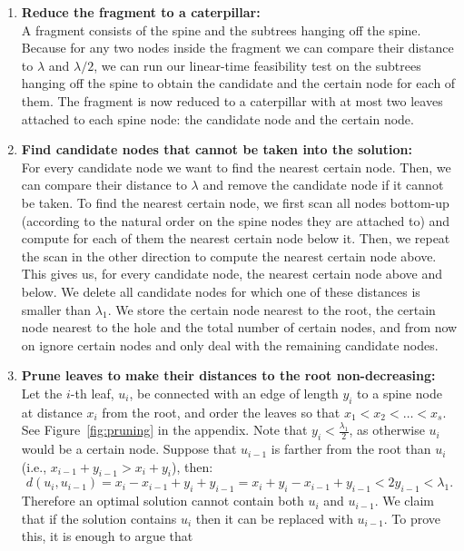 \documentclass[a4paper,UKenglish]{lipics-v2016}
\theoremstyle{plain}
\begin{document}
\begin{enumerate}
\item\textbf{Reduce the fragment to a caterpillar:}\\
A fragment consists of the spine and the subtrees hanging off the spine. Because for any two nodes inside the fragment we can compare
their distance to $\lambda$ and $\lambda/2$, we can run our linear-time feasibility test on the subtrees hanging off the spine to obtain
the candidate and the certain node for each of them. The fragment is now reduced to a caterpillar with at most two leaves attached to each
spine node: the candidate node and the certain node.
\item\label{removing certain nodes}
\textbf{Find candidate nodes that cannot be taken into the solution:}\\
For every candidate node we want to find the nearest certain node. Then, we can compare their distance to $\lambda$ and remove the
candidate node if it cannot be taken. To find the nearest certain node, we first scan all nodes bottom-up (according to the natural order
on the spine nodes they are attached to) and compute for each of them the nearest certain node below it. Then, we repeat the scan
in the other direction to compute the nearest certain node above. This gives us, for every candidate node, the nearest certain node above
and below. We delete all candidate nodes for which one of these distances is smaller than $\lambda_{1}$.
We store the certain node nearest to the root, the certain node nearest to the hole and the total number of certain nodes,
and from now on ignore certain nodes and only deal with the remaining candidate nodes.
\item\label{making distances from the root monotone}
\textbf{Prune leaves to make their distances to the root non-decreasing:}\\
Let the $i$-th leaf, $u_{i}$, be connected with an edge of length $y_{i}$ to a spine node at distance $x_{i}$ from the root,
and order the leaves so that $x_{1}<x_{2}<\ldots<x_{s}$. See Figure~\ref{fig:pruning} in the appendix.
Note that $y_{i}<\frac{\lambda_{1}}{2}$, as otherwise $u_{i}$ would be a certain node.
Suppose that $u_{i-1}$ is farther from the root than $u_i$ (i.e.,
$x_{i-1}+y_{i-1} > x_i+y_i$), then:
$$d(u_{i},u_{i-1}) = x_i-x_{i-1}+y_i+y_{i-1} = x_{i} + y_{i} - x_{i-1} + y_{i-1} < 2y_{i-1} < \lambda_1.$$
Therefore an optimal solution cannot contain both $u_{i}$ and $u_{i-1}$. We claim that if the solution contains
$u_{i}$ then it can be replaced with $u_{i-1}$. To prove this, it is enough to argue that

\end{enumerate}
\end{document}
